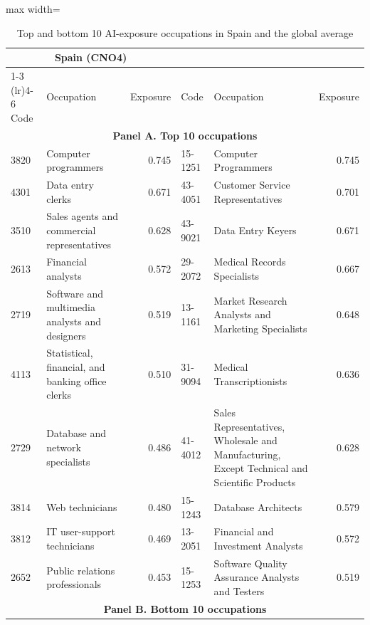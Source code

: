 \begin{table}[H]
\centering
\caption{Top and bottom 10 AI-exposure occupations in Spain and the global average}
\label{tab:top_bottom_exposure_comparison}

\footnotesize

\begin{adjustbox}{max width=\linewidth}
\begin{tabular}{
  l
  >{\raggedright\arraybackslash}p{4.8cm}
  r
  l
  >{\raggedright\arraybackslash}p{7.0cm}
  r
}
\toprule
\multicolumn{3}{c}{Spain (CNO4)} &
\multicolumn{3}{c}{Global average (O*NET)} \\
\cmidrule(lr){1-3}
\cmidrule(lr){4-6}
Code & Occupation & Exposure &
Code & Occupation & Exposure \\
\midrule

\multicolumn{6}{c}{\textbf{Panel A. Top 10 occupations}} \\
\midrule

3820 & Computer programmers & 0.745 & 15-1251 & Computer Programmers & 0.745 \\
4301 & Data entry clerks & 0.671 & 43-4051 & Customer Service Representatives & 0.701 \\
3510 & Sales agents and commercial representatives & 0.628 & 43-9021 & Data Entry Keyers & 0.671 \\
2613 & Financial analysts & 0.572 & 29-2072 & Medical Records Specialists & 0.667 \\
2719 & Software and multimedia analysts and designers & 0.519 & 13-1161 & Market Research Analysts and Marketing Specialists & 0.648 \\
4113 & Statistical, financial, and banking office clerks & 0.510 & 31-9094 & Medical Transcriptionists & 0.636 \\
2729 & Database and network specialists & 0.486 & 41-4012 & Sales Representatives, Wholesale and Manufacturing, Except Technical and Scientific Products & 0.628 \\
3814 & Web technicians & 0.480 & 15-1243 & Database Architects & 0.579 \\
3812 & IT user-support technicians & 0.469 & 13-2051 & Financial and Investment Analysts & 0.572 \\
2652 & Public relations professionals & 0.453 & 15-1253 & Software Quality Assurance Analysts and Testers & 0.519 \\
\midrule
\multicolumn{6}{c}{\textbf{Panel B. Bottom 10 occupations}} \\
\midrule


\end{tabular}
\end{adjustbox}
\end{table}
